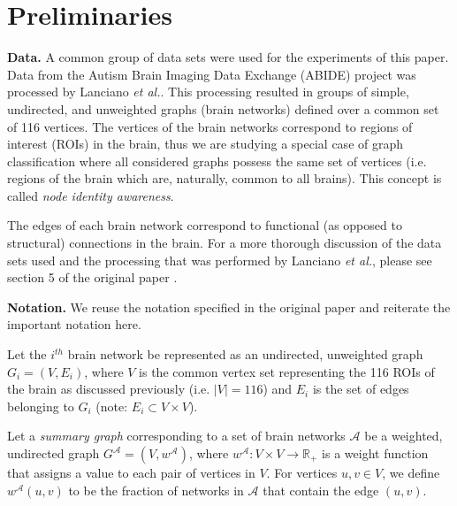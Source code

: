\documentclass[letterpaper]{article}
\begin{document}
\section{Preliminaries}


\textbf{Data.}
A common group of data sets were used for the experiments of this paper.
Data from the Autism Brain Imaging Data Exchange (ABIDE) project \cite{craddock2013} was processed by Lanciano \emph{et al.}. %
This processing resulted in groups of simple, undirected, and unweighted graphs (brain networks) defined over a common set of 116 vertices.
The vertices of the brain networks correspond to regions of interest (ROIs) in the brain, thus we are studying a special case of graph classification where all considered graphs possess the same set of vertices (i.e. regions of the brain which are, naturally, common to all brains).
This concept is called \emph{node identity awareness}.

The edges of each brain network correspond to functional (as opposed to structural) connections in the brain.
For a more thorough discussion of the data sets used and the processing that was performed by Lanciano \emph{et al.}, please see section 5 of the original paper \cite{lanciano2020}.

\textbf{Notation.}
We reuse the notation specified in the original paper and reiterate the important notation here.

Let the $i^{th}$ brain network be represented as an undirected, unweighted graph $G_i = (V, E_i)$, where $V$ is the common vertex set representing the 116 ROIs of the brain as discussed previously (i.e. $|V| = 116$) and $E_i$ is the set of edges belonging to $G_i$ (note: $E_i \subset V \times V$).

Let a \emph{summary graph} corresponding to a set of brain networks $\mathcal{A}$ be a weighted, undirected graph $G^{\mathcal{A}} = (V, w^{\mathcal{A}})$, where $w^{\mathcal{A}}: V \times V \rightarrow \mathbb{R}_+$ is a weight function that assigns a value to each pair of vertices in $V$.
For vertices $u,v \in V$, we define $w^{\mathcal{A}}(u,v)$ to be the fraction of networks in $\mathcal{A}$ that contain the edge $(u,v)$.
\end{document}
